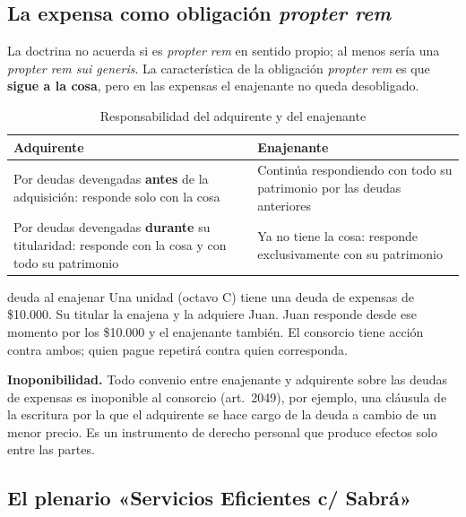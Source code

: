 \documentclass[12pt,oneside]{book}
\begin{document}
\subsection{La expensa como obligación \textit{propter rem}}

La doctrina no acuerda si es \textit{propter rem} en sentido propio; al menos sería una \textit{propter rem sui generis}. La característica de la obligación \textit{propter rem} es que \textbf{sigue a la cosa}, pero en las expensas el enajenante no queda desobligado.

\begin{table}[H]
\centering
\small
\begin{tabularx}{\textwidth}{>{\raggedright\arraybackslash}X>{\raggedright\arraybackslash}X}
\toprule
\textbf{Adquirente} & \textbf{Enajenante} \\
\midrule
Por deudas devengadas \textbf{antes} de la adquisición: responde solo con la cosa & Continúa respondiendo con todo su patrimonio por las deudas anteriores \\
Por deudas devengadas \textbf{durante} su titularidad: responde con la cosa y con todo su patrimonio & Ya no tiene la cosa: responde exclusivamente con su patrimonio \\
\bottomrule
\end{tabularx}
\caption{Responsabilidad del adquirente y del enajenante}
\end{table}

\begin{ejemplo}{deuda al enajenar}
Una unidad (octavo C) tiene una deuda de expensas de \$10.000. Su titular la enajena y la adquiere Juan. Juan responde desde ese momento por los \$10.000 y el enajenante también. El consorcio tiene acción contra ambos; quien pague repetirá contra quien corresponda.
\end{ejemplo}

\begin{importante}
\textbf{Inoponibilidad.} Todo convenio entre enajenante y adquirente sobre las deudas de expensas es inoponible al consorcio (art.~2049), por ejemplo, una cláusula de la escritura por la que el adquirente se hace cargo de la deuda a cambio de un menor precio. Es un instrumento de derecho personal que produce efectos solo entre las partes.
\end{importante}

\subsection{El plenario «Servicios Eficientes c/ Sabrá»}
\end{document}
